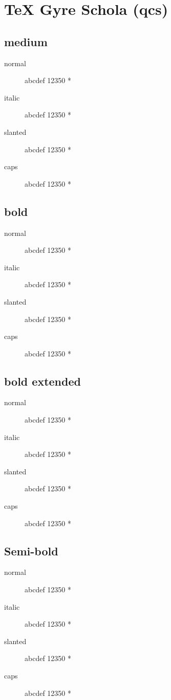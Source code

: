 \section{\TeX{} Gyre Schola (qcs)}

\subsection{medium}
\begin{description}
    \item [normal]  abcdef 12350 *
    \item [italic]  abcdef 12350 *
    \item [slanted]  abcdef 12350 *
    \item [caps]  abcdef 12350 *
\end{description}
    
\subsection{bold}
\begin{description}
    \item [normal]  abcdef 12350 *
    \item [italic]  abcdef 12350 *
    \item [slanted]  abcdef 12350 *
    \item [caps]  abcdef 12350 *
\end{description}
    
\subsection{bold extended}
\begin{description}
    \item [normal]  abcdef 12350 *
    \item [italic]  abcdef 12350 *
    \item [slanted]  abcdef 12350 *
    \item [caps]  abcdef 12350 *
\end{description}

\subsection{Semi-bold}
\begin{description}
    \item [normal]  abcdef 12350 *
    \item [italic]  abcdef 12350 *
    \item [slanted]  abcdef 12350 *
    \item [caps]  abcdef 12350 *
\end{description}

